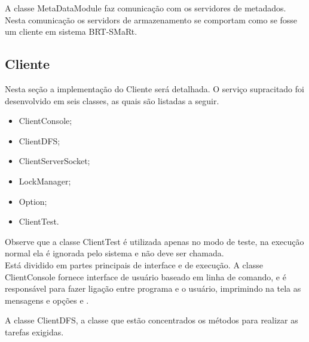 A classe MetaDataModule faz comunicação com os servidores de metadados. Nesta comunicação os servidors de armazenamento se comportam como se fosse um cliente em sistema BRT-SMaRt.

\subsection{Cliente}
Nesta seção a implementação do Cliente será detalhada. O serviço supracitado foi desenvolvido em seis classes, as quais são listadas a seguir.
\\

\begin{itemize}
	\item ClientConsole;
	\item ClientDFS;
	\item ClientServerSocket;
	\item LockManager;
	\item Option;
	\item ClientTest.
\end{itemize}

Observe que a classe ClientTest é utilizada apenas no modo de teste, na execução normal ela é ignorada pelo sistema e não deve ser chamada.
\\

Está dividido em partes principais de interface e de execução. 
A classe ClientConsole fornece interface de usuário baseado em linha de comando, e é responsável para fazer ligação entre programa e o usuário, imprimindo na tela as mensagens e opções e .

A classe ClientDFS, a classe que estão concentrados os métodos para realizar as tarefas exigidas.
	
	
	
